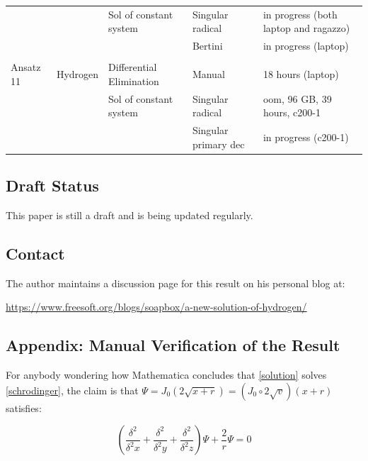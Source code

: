 \documentclass{article}
\begin{document}
\begin{tabular}{lllll}
           &               &Sol of constant system   &Singular radical      &in progress (both laptop and ragazzo)\\
           &               &                         &Bertini               &in progress (laptop)\\
           &               &                         &                      &\\
Ansatz 11  &Hydrogen       &Differential Elimination &Manual                &18 hours (laptop)\\
           &               &Sol of constant system   &Singular radical      &oom, 96 GB, 39 hours, c200-1\\
           &               &                         &Singular primary dec  &in progress (c200-1)\\
\end{tabular}

\subsection*{Draft Status}

This paper is still a draft and is being updated regularly.

\subsection*{Contact}

The author maintains a discussion page for this result on his personal blog at:

\begin{center}
\small
\url{https://www.freesoft.org/blogs/soapbox/a-new-solution-of-hydrogen/}
\end{center}

\vfill\eject
\subsection*{Appendix: Manual Verification of the Result}
For anybody wondering how Mathematica concludes that \eqref{solution} solves \eqref{schrodinger},
the claim is that $\Psi = J_0(2\sqrt{x+r}) = (J_0 \circ 2\sqrt{v}) (x+r)$ satisfies:

\begin{equation}
\label{claim}
\left(\frac{\delta^2}{\delta^2 x} + \frac{\delta^2}{\delta^2 y} + \frac{\delta^2}{\delta^2 z}\right) \Psi + \frac{2}{r}\Psi = 0
\end{equation}

\vskip 12pt
\end{document}
